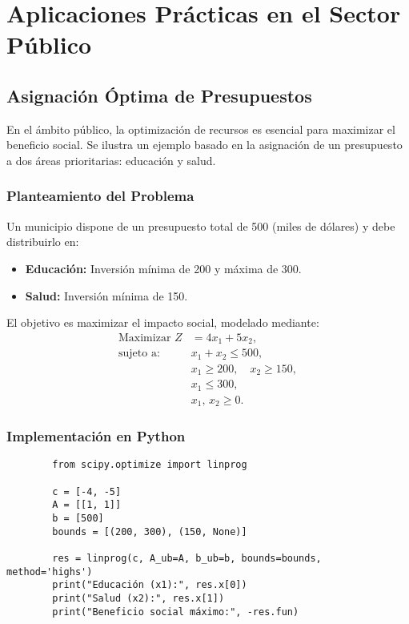 	\section{Aplicaciones Prácticas en el Sector Público}
	
	\subsection{Asignación Óptima de Presupuestos}
	En el ámbito público, la optimización de recursos es esencial para maximizar el beneficio social. Se ilustra un ejemplo basado en la asignación de un presupuesto a dos áreas prioritarias: educación y salud.
	
	\subsubsection{Planteamiento del Problema}
	Un municipio dispone de un presupuesto total de 500 (miles de dólares) y debe distribuirlo en:
	\begin{itemize}
		\item \textbf{Educación:} Inversión mínima de 200 y máxima de 300.
		\item \textbf{Salud:} Inversión mínima de 150.
	\end{itemize}
	El objetivo es maximizar el impacto social, modelado mediante:
	\[
	\begin{aligned}
		\text{Maximizar } Z &= 4x_1 + 5x_2,\\[1mm]
		\text{sujeto a: } \quad & x_1 + x_2 \leq 500,\\[1mm]
		& x_1 \geq 200, \quad x_2 \geq 150,\\[1mm]
		& x_1 \leq 300,\\[1mm]
		& x_1,\, x_2 \geq 0.
	\end{aligned}
	\]
	
	\subsubsection{Implementación en Python}
	\begin{verbatim}
		from scipy.optimize import linprog
		
		c = [-4, -5]
		A = [[1, 1]]
		b = [500]
		bounds = [(200, 300), (150, None)]
		
		res = linprog(c, A_ub=A, b_ub=b, bounds=bounds, method='highs')
		print("Educación (x1):", res.x[0])
		print("Salud (x2):", res.x[1])
		print("Beneficio social máximo:", -res.fun)
	\end{verbatim}
	

